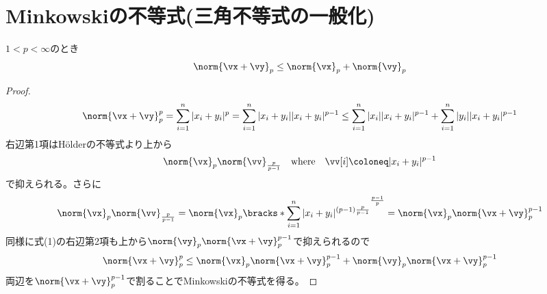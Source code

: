     \section{Minkowskiの不等式(三角不等式の一般化)}
        \begin{shadebox}
            $1<p<\infty$のとき
            \[\norm{\vx+\vy}_p \leq \norm{\vx}_p+\norm{\vy}_p\]
        \end{shadebox}
        \begin{proof}
            \begin{equation}
                \norm{\vx+\vy}_p^p = \sum_{i=1}^n{|x_i+y_i|^p} = \sum_{i=1}^n{|x_i+y_i||x_i+y_i|^{p-1}} \leq \sum_{i=1}^n{|x_i||x_i+y_i|^{p-1}}+\sum_{i=1}^n{|y_i||x_i+y_i|^{p-1}}
            \end{equation}
            右辺第1項はH\"olderの不等式より上から
            \[\norm{\vx}_p\norm{\vv}_{\frac{p}{p-1}}\quad\mathrm{where}\quad\vv[i]\coloneq|x_i+y_i|^{p-1}\]
            で抑えられる。さらに
            \[\norm{\vx}_p\norm{\vv}_{\frac{p}{p-1}} = \norm{\vx}_p\bracks*{\sum_{i=1}^n{|x_i+y_i|^{(p-1)\frac{p}{p-1}}}}^{\frac{p-1}{p}} = \norm{\vx}_p\norm{\vx+\vy}_p^{p-1}\]
            同様に式(1)の右辺第2項も上から$\norm{\vy}_p\norm{\vx+\vy}_p^{p-1}$で抑えられるので
            \[\norm{\vx+\vy}_p^p \leq \norm{\vx}_p\norm{\vx+\vy}_p^{p-1} + \norm{\vy}_p\norm{\vx+\vy}_p^{p-1}\]
            両辺を$\norm{\vx+\vy}_p^{p-1}$で割ることでMinkowskiの不等式を得る。
        \end{proof}